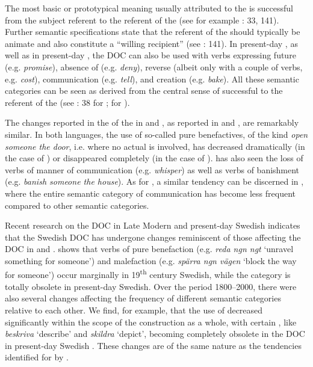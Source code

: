 \documentclass[output=paper]{langscibook}
\begin{document}
The most basic or prototypical meaning usually attributed to the  is successful  from the subject referent to the referent of the  (see for example \citealt{Goldberg1995}: 33, 141). Further semantic specifications state that the referent of the  should typically be animate and also constitute a “willing recipient” (see \citealt{Goldberg1995}: 141). In present-day , as well as in present-day , the DOC can also be used with verbs expressing future  (e.g. \textit{promise}), absence of  (e.g. \textit{deny}), reverse  (albeit only with a couple of verbs, e.g. \textit{cost}), communication (e.g. \textit{tell}), and creation (e.g. \textit{bake}). All these semantic categories can be seen as derived from the central sense of successful  to the referent of the  (see \citealt{Goldberg1995}: 38 for ; \citealt{Geeraerts1998} for ). 



The changes reported in the  of the  in  and , as reported in  \citet{CollemanDe_Clerck2011} and \citet{Colleman2011}, are remarkably similar. In both languages, the use of so-called pure benefactives, of the kind \textit{open someone the door}, i.e. where no actual  is involved, has decreased dramatically (in the case of ) or disappeared completely (in the case of ).  has also seen the loss of verbs of manner of communication (e.g. \textit{whisper}) as well as verbs of banishment (e.g. \textit{banish someone the house}). As for , a similar tendency can be discerned in , where the entire semantic category of communication has become less frequent compared to other semantic categories.



Recent research on the DOC in Late Modern and present-day Swedish indicates that the Swedish DOC has undergone changes reminiscent of those affecting the DOC in  and . \textcite{ValdesonSubmitted} shows that verbs of pure benefaction (e.g. \textit{reda ngn ngt} ‘unravel something for someone’) and malefaction (e.g. \textit{spärra ngn vägen} ‘block the way for someone’) occur marginally in 19\textsuperscript{th} century Swedish, while the category is totally obsolete in present-day Swedish. Over the period 1800–2000, there were also several changes affecting the frequency of different semantic categories relative to each other. We find, for example, that the use of  decreased significantly within the scope of the construction as a whole, with certain , like \textit{beskriva} ‘describe’ and \textit{skildra} ‘depict’, becoming completely obsolete in the DOC in present-day Swedish \parencite{ValdesonSubmitted}. These changes are of the same nature as the tendencies identified for  by \citet{Colleman2011}.
\end{document}
